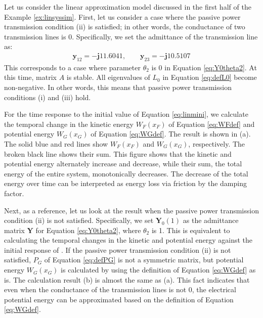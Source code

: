 \documentclass[tombow,dvipdfmx]{corona-a5-1.1}
\begin{document}
\begin{例}\label{ex:energylin}
Let us consider the linear approximation model discussed in the first half of the Example \ref{ex:linsyssim}.
First, let us consider a case where the passive power transmission condition (ii) is satisfied; in other words, the conductance of two transmission lines is 0.
Specifically, we set the admittance of the transmission line as:
\begin{align}\label{eq:bothlossless}
\bm{y}_{12} = - \bm{j} 11.6041, \qquad
\bm{y}_{23} =  - \bm{j} 10.5107
\end{align}
This corresponds to a case where parameter $\theta_2$ is 0 in Equation \ref{eq:Y0theta2}.
At this time, matrix $A$ is stable. All eigenvalues of $L_0$ in Equation \ref{eq:defL0} become non-negative.
In other words, this means that passive power transmission conditions (i) and (iii) hold. 

For the time response to the initial value of Equation \ref{eq:linmini}, we calculate the temporal change in the kinetic energy $W_F(x_F)$ of Equation \ref{eq:WFdef} and potential energy $W_G(x_G)$ of Equation \ref{eq:WGdef}.
The result is shown in (a). The solid blue and red lines show $W_F(x_F)$ and $W_G(x_G)$, respectively.
The broken black line shows their sum. This figure shows that the kinetic and potential energy alternately increase and decrease, while their sum, the total energy of the entire system, monotonically decreases. 
The decrease of the total energy over time can be interpreted as energy loss via friction by the damping factor.

Next, as a reference, let us look at the result when the passive power transmission condition (ii) is not satisfied.
Specifically, we set $\bm{Y}_0(1)$ as the admittance matrix $\bm{Y}$ for Equation \ref{eq:Y0theta2}, where $\theta_2$ is 1.
This is equivalent to calculating the temporal changes in the kinetic and potential energy against the initial response of .
If the passive power transmission condition (ii) is not satisfied, $P_G$ of Equation \ref{eq:defPG} is not a symmetric matrix, but potential energy $W_G(x_G)$ is calculated by using the definition of Equation \ref{eq:WGdef} as is.
The calculation result (b) is almost the same as (a).
This fact indicates that even when the conductance of the transmission lines is not 0, the electrical potential energy can be approximated based on the definition of Equation \ref{eq:WGdef}.
\end{例}
\end{document}
